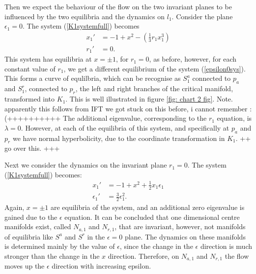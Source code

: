 Then we expect the behaviour of the flow on the two invariant planes to be influenced by the two equilibria and the dynamics on $l_1$.
Consider the plane $\epsilon_1=0$. The system (\ref{K1systemfull}) becomes
\begin{align} \label{epsilon0sys}
x_1' &= -1 +x^2 - \left( \frac{1}{3}r_1x_1^3 \right)\\
r_1' &= 0.
\end{align}
This system has equilibria at $x= \pm1$, for $r_1=0$, as before, however, for each constant value of $r_1$, we get a different equilibrium of the system (\ref{epsilon0sys}). This forms a curve of equlilbria, which can be recognise as $S^a_1$ connected to $p_a$ and $S^r_1$, connected to $p_r$, the left and right branches of the critical manifold, transformed into $K_1$. This is well illustrated in figure \ref{fig: chart 2 fig}. Note. apparently this follows from IFT we got stuck on this before, i cannot remember :(++++++++++
The additional eigenvalue, corresponding to the $r_1$ equation, is $\lambda=0$. However, at each of the equilibria of this system, and specifically at $p_a$ and $p_r$ we have normal hyperbolicity, due to the coordinate transformation in $K_1$. ++ go over this. +++

Next we consider the dynamics on the invariant plane $r_1=0$.
The system (\ref{K1systemfull}) becomes: 
\begin{align}
x_1' &= -1 +x^2 + \frac{1}{2} x_1 \epsilon_1 \\
\epsilon_1' &= \frac{3}{2} \epsilon_1^2 .
\end{align}
Again, $x= \pm 1$ are equilibria of the system, and an additional zero eigenvalue is gained due to the $\epsilon$ equation. It can be concluded that one dimensional centre manifolds exist, called $N_{a,1}$ and $N_{r,1}$, that are invariant, however, not manifolds of equilibria like $S^a$ and $S^r$ in the $\epsilon=0$ plane. The dynamics on these manifolds is determined mainly by the value of $\epsilon$, since the change in the $\epsilon$ direction is much stronger than the change in the $x$ direction. Therefore, on $N_{a,1}$ and $N_{r,1}$ the flow moves up the $\epsilon$ direction with increasing epsilon.

